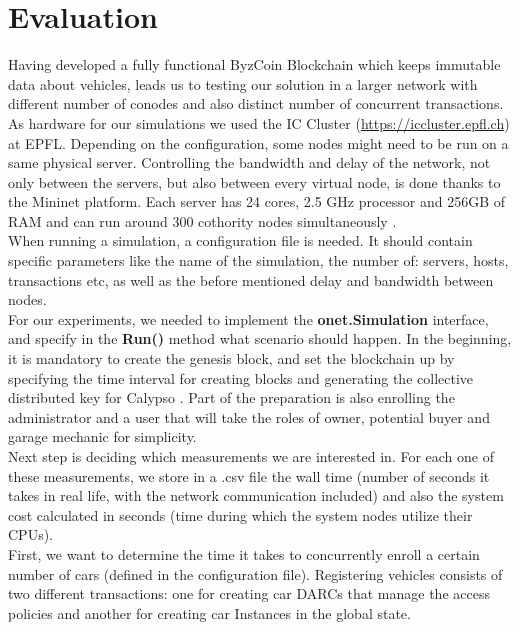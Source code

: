 \section{Evaluation} \label{Evaluation}

Having developed a fully functional ByzCoin Blockchain which keeps immutable data about vehicles, leads us to testing our solution in a larger network with different number of conodes and also distinct number of concurrent transactions.\\
\newline
As hardware for our simulations we used the IC Cluster (\url{https://iccluster.epfl.ch}) at EPFL. Depending on the configuration, some nodes might need to be run on a same physical server. Controlling the bandwidth and delay of the network, not only between the servers, but also between every virtual node, is done thanks to the Mininet \cite{Mininet} platform. Each server has 24 cores, 2.5 GHz processor and 256GB of RAM and can run around 300 cothority nodes simultaneously \cite{Mininet}.\\
\newline
When running a simulation, a configuration file is needed. It should contain specific parameters like the name of the simulation, the number of: servers, hosts, transactions etc, as well as the before mentioned delay and bandwidth between nodes.\\
\newline
For our experiments, we needed to implement the \textbf{onet.Simulation} \cite{Onet Simulation} interface, and specify in the \textbf{Run()} method what scenario should happen. In the beginning, it is mandatory to create the genesis block, and set the blockchain up by specifying the time interval for creating blocks and generating the collective distributed key for Calypso \cite{Calypso}. Part of the preparation is also enrolling the administrator and a user that will take the roles of owner, potential buyer and garage mechanic for simplicity.\\
\newline
Next step is deciding which measurements we are interested in. For each one of these measurements, we store in a .csv file the wall time (number of seconds it takes in real life, with the network communication included) and also the system cost calculated in seconds (time during which the system nodes utilize their CPUs).\\
\newline
First, we want to determine the time it takes to concurrently enroll a certain number of cars (defined in the configuration file). Registering vehicles consists of two different transactions: one for creating car DARCs that manage the access policies and another for creating car Instances in the global state.\\
